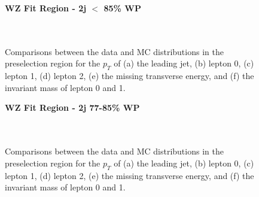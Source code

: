 \begin{figure}[H]
    \centering
    \textbf{WZ Fit Region - 2j $<$ 85\% WP}\\
    \\
    \\
    \caption{Comparisons between the data and MC distributions in the preselection region for the $p_T$ of (a) the leading jet, (b) lepton 0, (c) lepton 1, (d) lepton 2, (e) the missing transverse energy, and (f) the invariant mass of lepton 0 and 1.}
    \label{kin:WP_2j_not85}
\end{figure}

\begin{figure}[H]
    \centering
    \textbf{WZ Fit Region - 2j 77-85\% WP}\\
    \\
    \\
    \caption{Comparisons between the data and MC distributions in the preselection region for the $p_T$ of (a) the leading jet, (b) lepton 0, (c) lepton 1, (d) lepton 2, (e) the missing transverse energy, and (f) the invariant mass of lepton 0 and 1.}
    \label{kin:WP_2j_77_85}
\end{figure}

